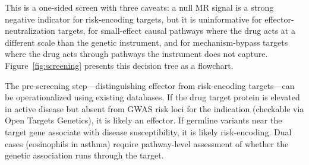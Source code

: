 \documentclass[11pt]{article}
\begin{document}
This is a one-sided screen with three caveats: a null MR signal is a strong negative indicator for risk-encoding targets, but it is uninformative for effector-neutralization targets, for small-effect causal pathways where the drug acts at a different scale than the genetic instrument, and for mechanism-bypass targets where the drug acts through pathways the instrument does not capture. Figure~\ref{fig:screening} presents this decision tree as a flowchart.

The pre-screening step---distinguishing effector from risk-encoding targets---can be operationalized using existing databases. If the drug target protein is elevated in active disease but absent from GWAS risk loci for the indication (checkable via Open Targets Genetics), it is likely an effector. If germline variants near the target gene associate with disease susceptibility, it is likely risk-encoding. Dual cases (eosinophils in asthma) require pathway-level assessment of whether the genetic association runs through the target.
\end{document}

